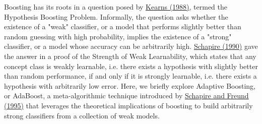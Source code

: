 \documentclass[submission]{eptcs}
\begin{document}
Boosting has its roots in a question posed by \href{https://www.cis.upenn.edu/~mkearns/papers/boostnote.pdf}{Kearns (1988)}, termed the Hypothesis Boosting Problem. Informally, the question asks whether the existence of a "weak" classifier, or a model that performs slightly better than random guessing with high probability, implies the existence of a "strong" classifier, or a model whose accuracy can be arbitrarily high. \href{http://rob.schapire.net/papers/strengthofweak.pdf}{Schapire (1990)} gave the answer in a proof of the Strength of Weak Learnability, which states that any concept class is weakly learnable, i.e. there exists a hypothesis with slightly better than random performance, if and only if it is strongly learnable, i.e. there exists a hypothesis with arbitrarily low error. Here, we briefly explore Adaptive Boosting, or AdaBoost, a meta-algorithmic technique introduced by \href{https://link.springer.com/chapter/10.1007/3-540-59119-2_166}{Schapire and Freund (1995)} that leverages the theoretical implications of boosting to build arbitrarily strong classifiers from a collection of weak models. \\
\end{document}
